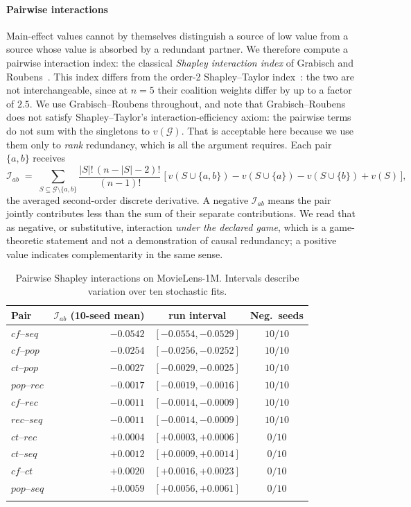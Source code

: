 \documentclass[pdflatex,sn-basic,Numbered]{sn-jnl}
\theoremstyle{plain}
\theoremstyle{definition}
\newcommand{\G}{\mathcal{G}}
\begin{document}
\paragraph{Pairwise interactions}
Main-effect values cannot by themselves distinguish a source of low value from
a source whose value is absorbed by a redundant partner. We therefore compute a
pairwise interaction index: the classical \emph{Shapley interaction index} of
Grabisch and Roubens~\citep{grabisch1999interaction}. This index differs from
the order-2 Shapley--Taylor
index~\citep{sundararajan2020shapleytaylor}: the two are not interchangeable,
since at $n=5$ their coalition weights differ by up to a factor of $2.5$. We
use Grabisch--Roubens throughout, and note that
Grabisch--Roubens does not satisfy Shapley--Taylor's interaction-efficiency
axiom: the pairwise terms do not sum with the singletons to $v(\G)$. That is
acceptable here because we use them only to \emph{rank} redundancy, which is
all the argument requires. Each pair $\{a,b\}$ receives
%
\begin{equation}
\mathcal{I}_{ab} \;=\;
\sum_{S \subseteq \G \setminus \{a,b\}}
\frac{|S|!\,(n - |S| - 2)!}{(n-1)!}\;
\bigl[\,v(S \cup \{a,b\}) - v(S \cup \{a\}) - v(S \cup \{b\}) + v(S)\,\bigr],
\label{eq:interaction}
\end{equation}
%
the averaged second-order discrete derivative. A negative $\mathcal{I}_{ab}$
means the pair jointly contributes less than the sum of their separate
contributions. We read that as negative, or substitutive, interaction
\emph{under the declared game}, which is a game-theoretic statement and not a
demonstration of causal redundancy; a positive value indicates complementarity
in the same sense.

\begin{table}[tbp]
\caption{Pairwise Shapley interactions on MovieLens-1M. Intervals describe
variation over ten stochastic fits.}
\label{tab:taylor}
\begin{tabular}{@{}lrcc@{}}
\toprule
Pair & $\mathcal{I}_{ab}$ (10-seed mean) & run interval & Neg.\ seeds \\
\midrule
$cf$--$seq$  & $-0.0542$ & $[-0.0554, -0.0529]$ & $10/10$ \\
$cf$--$pop$  & $-0.0254$ & $[-0.0256, -0.0252]$ & $10/10$ \\
$ct$--$pop$  & $-0.0027$ & $[-0.0029, -0.0025]$ & $10/10$ \\
$pop$--$rec$ & $-0.0017$ & $[-0.0019, -0.0016]$ & $10/10$ \\
$cf$--$rec$  & $-0.0011$ & $[-0.0014, -0.0009]$ & $10/10$ \\
$rec$--$seq$ & $-0.0011$ & $[-0.0014, -0.0009]$ & $10/10$ \\
$ct$--$rec$  & $+0.0004$ & $[+0.0003, +0.0006]$ & $0/10$ \\
$ct$--$seq$  & $+0.0012$ & $[+0.0009, +0.0014]$ & $0/10$ \\
$cf$--$ct$   & $+0.0020$ & $[+0.0016, +0.0023]$ & $0/10$ \\
$pop$--$seq$ & $+0.0059$ & $[+0.0056, +0.0061]$ & $0/10$ \\
\botrule
\end{tabular}
\end{table}
\end{document}
